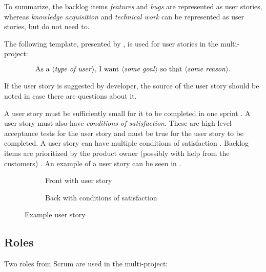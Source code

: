 To summarize, the backlog items \emph{features} and \emph{bugs} are represented as user stories, whereas \emph{knowledge acquisition} and \emph{technical work} can be represented as user stories, but do not need to.

The following template, presented by \textcite{cohn2009}, is used for user stories in the multi-project:

$$\text{As a $\langle{}$\emph{type of user}$\rangle{}$, I want $\langle{}$\emph{some goal}$\rangle{}$ so that $\langle{}$\emph{some reason}$\rangle{}$}.$$

If the user story is suggested by developer, the source of the user story should be noted in case there are questions about it.

A user story must be sufficiently small for it to be completed in one sprint \parencite{cohn2009}. A user story must also have \emph{conditions of satisfaction}. These are high-level acceptance tests for the user story and must be true for the user story to be completed. A user story can have multiple conditions of satisfaction \cite{cohn2009}. Backlog items are prioritized by the product owner (possibly with help from the customers) \cite{larman2003}. An example of a user story can be seen in . 

\begin{figure}
  \centering
  \begin{subfigure}[t]{0.47\textwidth}
    \centering
    \caption{Front with user story}
  \end{subfigure}
  \begin{subfigure}[t]{0.47\textwidth}
    \centering
    \caption{Back with conditions of satisfaction}
  \end{subfigure}
  \caption{Example user story}\label{fig:user_story_ex}
\end{figure}

\subsection{Roles}
Two roles from Scrum are used in the multi-project:

